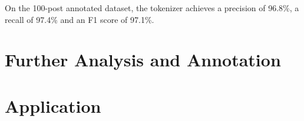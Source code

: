 On the 100-post annotated dataset, the tokenizer achieves a precision of 96.8\%,
a recall of 97.4\% and an F1 score of 97.1\%.

\section{Further Analysis and Annotation}

\section{Application}